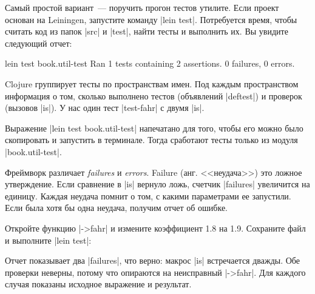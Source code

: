 Самый простой вариант~--- поручить прогон тестов утилите. Если проект основан на
Leiningen, запустите команду \spverb|lein test|.
Потребуется время, чтобы считать код из папок \spverb|src| и \spverb|test|,
найти тесты и выполнить их. Вы увидите следующий отчет:

\begin{english}
  \begin{text}
lein test book.util-test
Ran 1 tests containing 2 assertions.
0 failures, 0 errors.
  \end{text}
\end{english}

Clojure группирует тесты по пространствам имен. Под каждым пространством
информация о том, сколько выполнено тестов (объявлений \spverb|deftest|) и
проверок (вызовов \spverb|is|). У нас один тест \spverb|test-fahr| с двумя
\spverb|is|.

Выражение \spverb|lein test book.util-test| напечатано для того, чтобы его можно
было скопировать и запустить в терминале. Тогда сработают тесты только из модуля
\spverb|book.util-test|.

Фреймворк различает \emph{failures} и \emph{errors}. Failure (анг. <<неудача>>)
это ложное утверждение. Если сравнение в \spverb|is| вернуло ложь, счетчик
\spverb|failures| увеличится на единицу. Каждая неудача помнит о том, с какими
параметрами ее запустили. Если была хотя бы одна неудача, получим отчет об
ошибке.

Откройте функцию \spverb|->fahr| и измените коэффициент 1.8 на 1.9. Сохраните
файл и выполните \spverb|lein test|:

\begin{english}
\end{english}

Отчет показывает два \spverb|failures|, что верно: макрос \spverb|is|
встречается дважды. Обе проверки неверны, потому что опираются на неисправный
\spverb|->fahr|. Для каждого случая показаны исходное выражение и результат.

